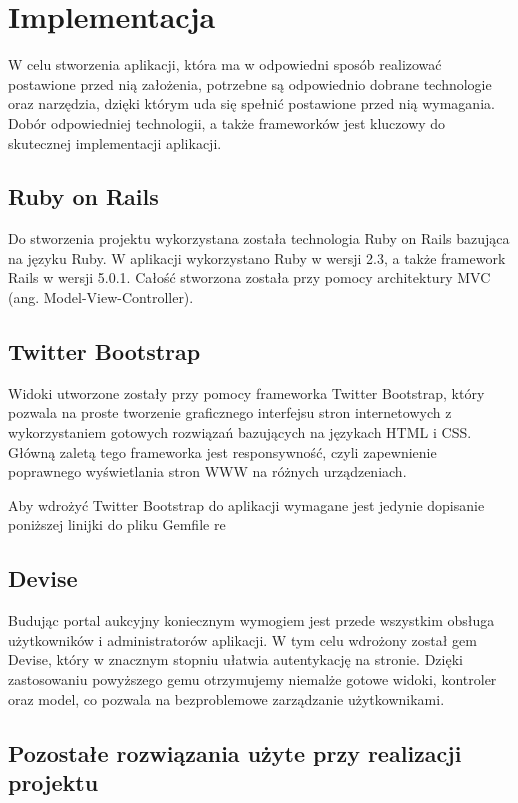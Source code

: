 \documentclass[brudnopis]{xmgr}
\begin{document}
\chapter{Implementacja}
W celu stworzenia aplikacji, która ma w odpowiedni sposób realizować postawione przed nią
założenia, potrzebne są odpowiednio dobrane technologie oraz narzędzia, dzięki którym uda się
spełnić postawione przed nią wymagania. Dobór odpowiedniej technologii, a także frameworków
jest kluczowy do skutecznej implementacji aplikacji.

\section{Ruby on Rails}
Do stworzenia projektu wykorzystana została technologia Ruby on Rails bazująca na języku Ruby.
W aplikacji wykorzystano Ruby w wersji 2.3, a także framework Rails w wersji 5.0.1. Całość stworzona
została przy pomocy architektury MVC (ang. Model-View-Controller).

\section{Twitter Bootstrap}
Widoki utworzone zostały przy pomocy frameworka Twitter Bootstrap, który pozwala na proste tworzenie
graficznego interfejsu stron internetowych z wykorzystaniem gotowych rozwiązań bazujących na językach
HTML i CSS. Główną zaletą tego frameworka jest responsywność, czyli zapewnienie poprawnego wyświetlania
stron WWW na różnych urządzeniach.

Aby wdrożyć Twitter Bootstrap do aplikacji wymagane jest jedynie dopisanie poniższej linijki do pliku Gemfile
re
\section{Devise}

Budując portal aukcyjny koniecznym wymogiem jest przede wszystkim obsługa użytkowników i administratorów aplikacji. W tym celu wdrożony został gem Devise, który w znacznym stopniu ułatwia autentykację na stronie. Dzięki zastosowaniu powyższego gemu otrzymujemy niemalże gotowe widoki, kontroler oraz model, co pozwala na bezproblemowe zarządzanie użytkownikami.

\section{Pozostałe rozwiązania użyte przy realizacji projektu}
\end{document}
